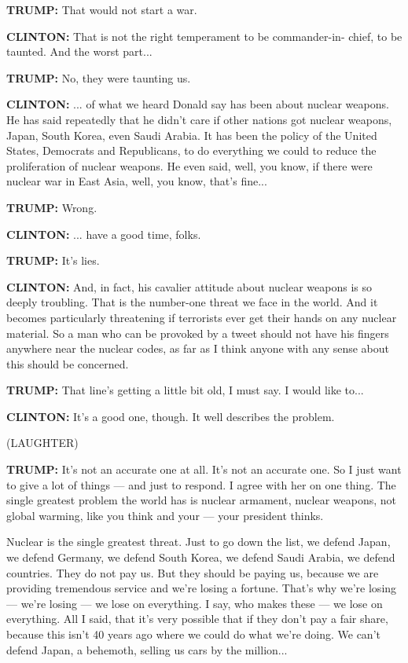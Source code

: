 \textbf{TRUMP:} That would not start a war.

\textbf{CLINTON:} That is not the right temperament to be commander-in-
chief, to be taunted. And the worst part...

\textbf{TRUMP:} No, they were taunting us.

\textbf{CLINTON:} ... of what we heard Donald say has been about nuclear
weapons. He has said repeatedly that he didn't care if other nations got
nuclear weapons, Japan, South Korea, even Saudi Arabia. It has been the
policy of the United States, Democrats and Republicans, to do everything
we could to reduce the proliferation of nuclear weapons. He even said,
well, you know, if there were nuclear war in East Asia, well, you know,
that's fine...

\textbf{TRUMP:} Wrong.

\textbf{CLINTON:} ... have a good time, folks.

\textbf{TRUMP:} It's lies.

\textbf{CLINTON:} And, in fact, his cavalier attitude about nuclear
weapons is so deeply troubling. That is the number-one threat we face in
the world. And it becomes particularly threatening if terrorists ever
get their hands on any nuclear material. So a man who can be provoked by
a tweet should not have his fingers anywhere near the nuclear codes, as
far as I think anyone with any sense about this should be concerned.

\textbf{TRUMP:} That line's getting a little bit old, I must say. I
would like to...

\textbf{CLINTON:} It's a good one, though. It well describes the
problem.

(LAUGHTER)

\textbf{TRUMP:} It's not an accurate one at all. It's not an accurate
one. So I just want to give a lot of things --- and just to respond. I
agree with her on one thing. The single greatest problem the world has
is nuclear armament, nuclear weapons, not global warming, like you think
and your --- your president thinks.

Nuclear is the single greatest threat. Just to go down the list, we
defend Japan, we defend Germany, we defend South Korea, we defend Saudi
Arabia, we defend countries. They do not pay us. But they should be
paying us, because we are providing tremendous service and we're losing
a fortune. That's why we're losing --- we're losing --- we lose on
everything. I say, who makes these --- we lose on everything. All I
said, that it's very possible that if they don't pay a fair share,
because this isn't 40 years ago where we could do what we're doing. We
can't defend Japan, a behemoth, selling us cars by the million...


